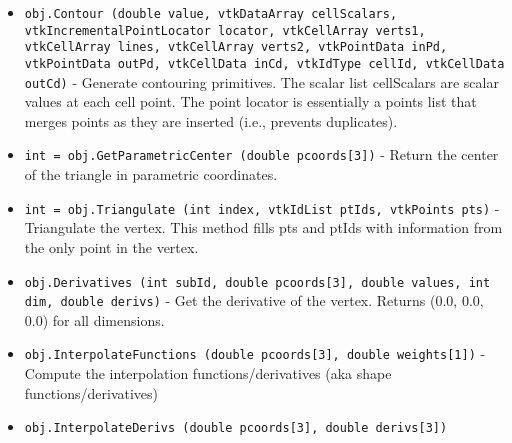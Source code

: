 \begin{itemize}
\item  \verb|obj.Contour (double value, vtkDataArray cellScalars, vtkIncrementalPointLocator locator, vtkCellArray verts1, vtkCellArray lines, vtkCellArray verts2, vtkPointData inPd, vtkPointData outPd, vtkCellData inCd, vtkIdType cellId, vtkCellData outCd)| -  Generate contouring primitives. The scalar list cellScalars are
 scalar values at each cell point. The point locator is essentially a
 points list that merges points as they are inserted (i.e., prevents
 duplicates).

\item  \verb|int = obj.GetParametricCenter (double pcoords[3])| -  Return the center of the triangle in parametric coordinates.

\item  \verb|int = obj.Triangulate (int index, vtkIdList ptIds, vtkPoints pts)| -  Triangulate the vertex. This method fills pts and ptIds with information
 from the only point in the vertex.

\item  \verb|obj.Derivatives (int subId, double pcoords[3], double values, int dim, double derivs)| -  Get the derivative of the vertex. Returns (0.0, 0.0, 0.0) for all
 dimensions.

\item  \verb|obj.InterpolateFunctions (double pcoords[3], double weights[1])| -  Compute the interpolation functions/derivatives
 (aka shape functions/derivatives)

\item  \verb|obj.InterpolateDerivs (double pcoords[3], double derivs[3])|

\end{itemize}
